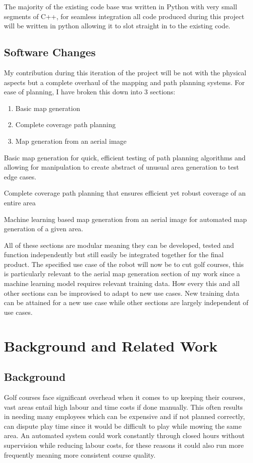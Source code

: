 \documentclass[final]{cmpreport_02}
\begin{document}
The majority of the existing code base was written in Python with very small segments of C++, for seamless integration all code produced during this project will be written in python allowing it to slot straight in to the existing code.

\subsection{Software Changes}
My contribution during this iteration of the project will be not with the physical aspects but a complete overhaul of the mapping and path planning systems.
For ease of planning, I have broken this down into 3 sections:
\begin{enumerate}
	\item Basic map generation
	\item Complete coverage path planning
	\item Map generation from an aerial image
\end{enumerate}

Basic map generation for quick, efficient testing of path planning algorithms and allowing for manipulation to create abstract of unusual area generation to test edge cases.

Complete coverage path planning that ensures efficient yet robust coverage of an entire area

Machine learning based map generation from an aerial image for automated map generation of a given area.

All of these sections are modular meaning they can be developed, tested and function independently but still easily be integrated together for the final product.
The specified use case of the robot will now be to cut golf courses, this is particularly relevant to the aerial map generation section of my work since a machine learning model requires relevant training data.
How every this and all other sections can be improvised to adapt to new use cases.
New training data can be attained for a new use case while other sections are largely independent of use cases.


\section{Background and Related Work}
\subsection{Background}
Golf courses face significant overhead when it comes to up keeping their courses, vast areas entail high labour and time costs if done manually. 
This often results in needing many employees which can be expensive and if not planned correctly, can dispute play time since it would be difficult to play while mowing the same area.
An automated system could work constantly through closed hours without supervision while reducing labour costs, for these reasons it could also run more frequently meaning more consistent course quality.
\end{document}
